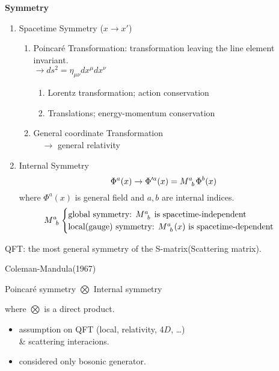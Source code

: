 \documentclass[11pt,letterpaper]{article}
\begin{document}
{\bf Symmetry}
%
 \begin{enumerate}
  \item Spacetime Symmetry ($x \rightarrow x'$)
   \begin{enumerate}
    \item Poincar\'{e} Transformation: transformation leaving the line element invariant. \\
    $\rightarrow ds^2 = \eta_{\mu \nu} dx^{\mu}dx^{\nu}$
    \begin{enumerate}
     \item Lorentz transformation; action conservation
     \item Translations; energy-momentum conservation
    \end{enumerate}
    \item General coordinate Transformation \\
    $\quad \rightarrow$ general relativity
   \end{enumerate}
%
  \item Internal Symmetry \\
    $$\Phi^{a}(x) \rightarrow \Phi'^{a}(x) = \tensor{M}{^a _b}\Phi^{b}(x)$$
    where $\Phi^{a}(x)$ is general field and $a,b$ are internal indices.
    \begin{equation*}
     \tensor{M}{^a _b}
     \begin{cases}
      \mbox{global symmetry: $\tensor{M}{^a _b}$ is spacetime-independent} \\
      \mbox{local(gauge) symmetry: $\tensor{M}{^a _b}(x)$ is spacetime-dependent}
     \end{cases}
    \end{equation*}
\end{enumerate}

\VS

QFT: the most general symmetry of the S-matrix(Scattering matrix).

%

\begin{note}
 Coleman-Mandula(1967)
 { \normalfont
  \begin{center}
   Poincar\'{e} symmetry $\bigotimes$ Internal symmetry
  \end{center}
%
where $\bigotimes$ is a direct product.  
 \begin{itemize}
  \item assumption on QFT (local, relativity, 4$D$, \ldots) \\
        \& scattering interacions.
  \item considered only bosonic generator. 
 \end{itemize}
 }
\end{note}
\end{document}
